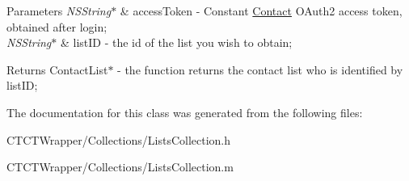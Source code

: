 \begin{DoxyParams}{Parameters}
{\em N\-S\-String$\ast$} & access\-Token -\/ Constant \hyperlink{interface_contact}{Contact} O\-Auth2 access token, obtained after login; \\
\hline
{\em N\-S\-String$\ast$} & list\-I\-D -\/ the id of the list you wish to obtain;\\
\hline
\end{DoxyParams}
\begin{DoxyReturn}{Returns}
Contact\-List$\ast$ -\/ the function returns the contact list who is identified by list\-I\-D; 
\end{DoxyReturn}


The documentation for this class was generated from the following files\-:\begin{DoxyCompactItemize}
\item 
C\-T\-C\-T\-Wrapper/\-Collections/Lists\-Collection.\-h\item 
C\-T\-C\-T\-Wrapper/\-Collections/Lists\-Collection.\-m\end{DoxyCompactItemize}
